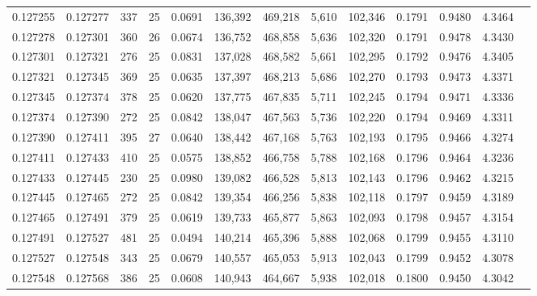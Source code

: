 \begin{tabular}{rrrrrrrrrrrrr}
0.127255 & 0.127277 &   337 &  25 &                                     0.0691 & 136,392 & 469,218 &   5,610 & 102,346 & 0.1791 & 0.9480 & 4.3464 \\
0.127278 & 0.127301 &   360 &  26 &                                     0.0674 & 136,752 & 468,858 &   5,636 & 102,320 & 0.1791 & 0.9478 & 4.3430 \\
0.127301 & 0.127321 &   276 &  25 &                                     0.0831 & 137,028 & 468,582 &   5,661 & 102,295 & 0.1792 & 0.9476 & 4.3405 \\
0.127321 & 0.127345 &   369 &  25 &                                     0.0635 & 137,397 & 468,213 &   5,686 & 102,270 & 0.1793 & 0.9473 & 4.3371 \\
0.127345 & 0.127374 &   378 &  25 &                                     0.0620 & 137,775 & 467,835 &   5,711 & 102,245 & 0.1794 & 0.9471 & 4.3336 \\
0.127374 & 0.127390 &   272 &  25 &                                     0.0842 & 138,047 & 467,563 &   5,736 & 102,220 & 0.1794 & 0.9469 & 4.3311 \\
0.127390 & 0.127411 &   395 &  27 &                                     0.0640 & 138,442 & 467,168 &   5,763 & 102,193 & 0.1795 & 0.9466 & 4.3274 \\
0.127411 & 0.127433 &   410 &  25 &                                     0.0575 & 138,852 & 466,758 &   5,788 & 102,168 & 0.1796 & 0.9464 & 4.3236 \\
0.127433 & 0.127445 &   230 &  25 &                                     0.0980 & 139,082 & 466,528 &   5,813 & 102,143 & 0.1796 & 0.9462 & 4.3215 \\
0.127445 & 0.127465 &   272 &  25 &                                     0.0842 & 139,354 & 466,256 &   5,838 & 102,118 & 0.1797 & 0.9459 & 4.3189 \\
0.127465 & 0.127491 &   379 &  25 &                                     0.0619 & 139,733 & 465,877 &   5,863 & 102,093 & 0.1798 & 0.9457 & 4.3154 \\
0.127491 & 0.127527 &   481 &  25 &                                     0.0494 & 140,214 & 465,396 &   5,888 & 102,068 & 0.1799 & 0.9455 & 4.3110 \\
0.127527 & 0.127548 &   343 &  25 &                                     0.0679 & 140,557 & 465,053 &   5,913 & 102,043 & 0.1799 & 0.9452 & 4.3078 \\
0.127548 & 0.127568 &   386 &  25 &                                     0.0608 & 140,943 & 464,667 &   5,938 & 102,018 & 0.1800 & 0.9450 & 4.3042 \\

\end{tabular}
